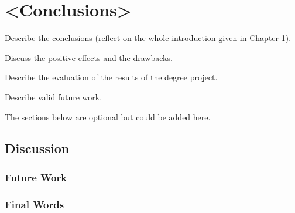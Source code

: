 \documentclass[/home/francois/latex/report/main.tex]{subfiles}
\begin{document}
\chapter{<Conclusions>}
Describe the conclusions (reflect on the whole introduction given in Chapter 1).

Discuss the positive effects and the drawbacks.

Describe the evaluation of the results of the degree project.

Describe valid future work.

The sections below are optional but could be added here.

\section{Discussion}

\subsection{Future Work}

\subsection{Final Words}
\end{document}
